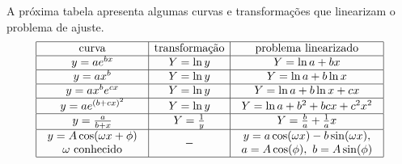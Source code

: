 \documentclass[main.tex]{subfiles}
\begin{document}
A próxima tabela apresenta algumas curvas e transformações que linearizam o problema de ajuste.
$$
\begin{array}{|c|c|c|}
\hline
\hbox{curva}&\hbox{transformação}&\hbox{problema linearizado}\\
\hline
y=ae^{bx}&Y=\ln y&Y=\ln a+ bx\\
\hline
y=ax^b&Y=\ln y&Y=\ln a+ b\ln x\\
\hline
y=ax^be^{cx}&Y=\ln y&Y=\ln a+ b\ln x+cx\\
\hline
y=ae^{(b+cx)^2}&Y=\ln y&Y=\ln a+b^2+ bc x+c^2x^2\\
\hline
y=\frac{a}{b+x}&Y=\frac{1}{y}&Y=\frac{b}{a}+\frac{1}{a}x\\
\hline
\begin{array}{c}y=A\cos(\omega x+\phi)\\ \omega\ \hbox{conhecido}\end{array}&-&\begin{array}{c}y=a\cos(\omega x)-b\sin(\omega x),\\a=A\cos(\phi),\ b=A\sin(\phi)\end{array}\\
\hline
\end{array}
$$
\end{document}
